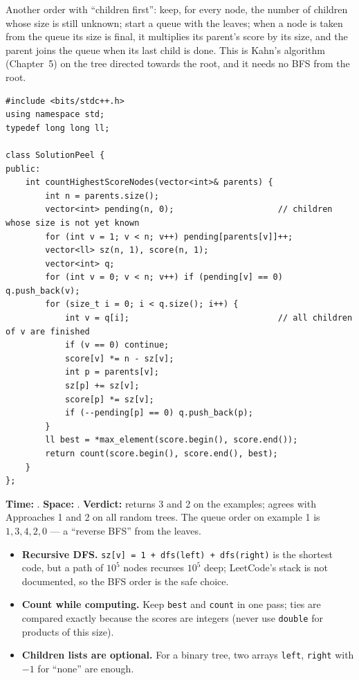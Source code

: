 \begin{alternativebox}
Another order with ``children first'': keep, for every node, the number of children whose size is still unknown; start a queue with the leaves; when a node is taken from the queue its size is final, it multiplies its parent's score by its size, and the parent joins the queue when its last child is done. This is Kahn's algorithm (Chapter~5) on the tree directed towards the root, and it needs no BFS from the root.

\begin{lstlisting}[style=cpp]
#include <bits/stdc++.h>
using namespace std;
typedef long long ll;

class SolutionPeel {
public:
    int countHighestScoreNodes(vector<int>& parents) {
        int n = parents.size();
        vector<int> pending(n, 0);                     // children whose size is not yet known
        for (int v = 1; v < n; v++) pending[parents[v]]++;
        vector<ll> sz(n, 1), score(n, 1);
        vector<int> q;
        for (int v = 0; v < n; v++) if (pending[v] == 0) q.push_back(v);
        for (size_t i = 0; i < q.size(); i++) {
            int v = q[i];                              // all children of v are finished
            if (v == 0) continue;
            score[v] *= n - sz[v];
            int p = parents[v];
            sz[p] += sz[v];
            score[p] *= sz[v];
            if (--pending[p] == 0) q.push_back(p);
        }
        ll best = *max_element(score.begin(), score.end());
        return count(score.begin(), score.end(), best);
    }
};
\end{lstlisting}
\begin{complexitybox}
\textbf{Time:} . \textbf{Space:} . \textbf{Verdict:} returns 3 and 2 on the examples; agrees with Approaches 1 and 2 on all random trees. The queue order on example 1 is $1, 3, 4, 2, 0$ --- a ``reverse BFS'' from the leaves.
\end{complexitybox}
\end{alternativebox}

\begin{tricksbox}
\begin{itemize}[leftmargin=*]
    \item \textbf{Recursive DFS.} \texttt{sz[v] = 1 + dfs(left) + dfs(right)} is the shortest code, but a path of $10^5$ nodes recurses $10^5$ deep; LeetCode's stack is not documented, so the BFS order is the safe choice.
    \item \textbf{Count while computing.} Keep \texttt{best} and \texttt{count} in one pass; ties are compared exactly because the scores are integers (never use \texttt{double} for products of this size).
    \item \textbf{Children lists are optional.} For a binary tree, two arrays \texttt{left}, \texttt{right} with $-1$ for ``none'' are enough.
\end{itemize}
\end{tricksbox}

